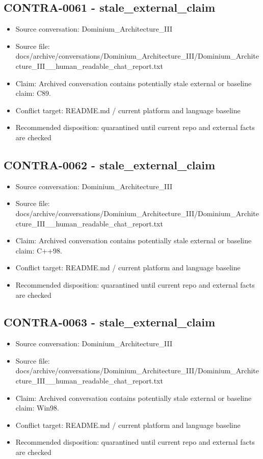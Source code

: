 \documentclass[11pt,a4paper]{report}
\begin{document}
\subsection{CONTRA-0061 - stale\_external\_claim}

\begin{itemize}
\item Source conversation: Dominium\_Architecture\_III
\item Source file: docs/archive/conversations/Dominium\_Architecture\_III/Dominium\_Architecture\_III\_\_human\_readable\_chat\_report.txt
\item Claim: Archived conversation contains potentially stale external or baseline claim: C89.
\item Conflict target: README.md / current platform and language baseline
\item Recommended disposition: quarantined until current repo and external facts are checked
\end{itemize}

\subsection{CONTRA-0062 - stale\_external\_claim}

\begin{itemize}
\item Source conversation: Dominium\_Architecture\_III
\item Source file: docs/archive/conversations/Dominium\_Architecture\_III/Dominium\_Architecture\_III\_\_human\_readable\_chat\_report.txt
\item Claim: Archived conversation contains potentially stale external or baseline claim: C++98.
\item Conflict target: README.md / current platform and language baseline
\item Recommended disposition: quarantined until current repo and external facts are checked
\end{itemize}

\subsection{CONTRA-0063 - stale\_external\_claim}

\begin{itemize}
\item Source conversation: Dominium\_Architecture\_III
\item Source file: docs/archive/conversations/Dominium\_Architecture\_III/Dominium\_Architecture\_III\_\_human\_readable\_chat\_report.txt
\item Claim: Archived conversation contains potentially stale external or baseline claim: Win98.
\item Conflict target: README.md / current platform and language baseline
\item Recommended disposition: quarantined until current repo and external facts are checked
\end{itemize}
\end{document}
